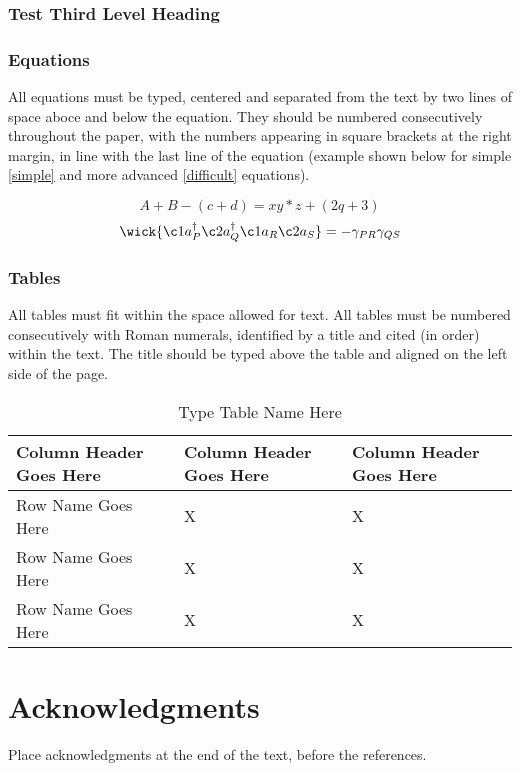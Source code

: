 \documentclass[twoside,onecolumn,12pt]{article}
\begin{document}
\subsubsection{Test Third Level Heading}
\lipsum[1-1]

\subsubsection{Equations}
All equations must be typed, centered and separated from the text by two lines of space aboce and below the equation. They should be numbered consecutively throughout the paper, with the numbers appearing in square brackets at the right margin, in line with the last line of the equation (example shown below for simple \eqref{simple} and more advanced \eqref{difficult} equations).

\begin{equation}
    A+B - (c+d) = xy*z+(2q+3) \label{simple}
\end{equation}
\begin{equation}
    \wick{\c1 a_P^\dagger \c2 a_Q^\dagger \c1 a_R \c2 a_S} = -\gamma_{PR}\gamma_{QS} \label{difficult}
\end{equation}

\subsubsection{Tables}
All tables must fit within the space allowed for text. All tables must be numbered consecutively with Roman numerals, identified by a title and cited (in order) within the text. The title should be typed above the table and aligned on the left side of the page.

\begin{table}[H]
    \caption{Type Table Name Here}
    \begin{tabularx}{\columnwidth}{l|X|X}
        \hline
        \textbf{Column Header Goes Here} & \textbf{Column Header Goes Here} & \textbf{Column Header Goes Here}\\
        \hline
        Row Name Goes Here & X & X\\
        Row Name Goes Here & X & X\\
        Row Name Goes Here & X & X\\
        \hline
    \end{tabularx}
\end{table}

\section{Acknowledgments}
Place acknowledgments at the end of the text, before the references.

\printbibliography
\end{document}
